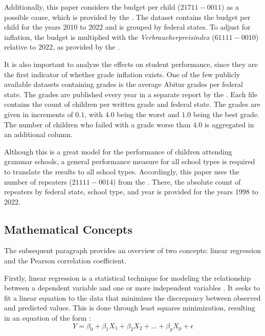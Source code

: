 Additionally, this paper considers the budget per child (\href{https://www-genesis.destatis.de/genesis//online?operation=table&code=21711-0011&bypass=true&levelindex=0&levelid=1706352648560#abreadcrumb}{$21711-0011$}) as a possible cause, which is provided  by the \citeauthor{statistische_bundesamt_statistisches_2024}. The dataset contains the budget per child for the years 2010 to 2022 and is grouped by federal states. To adjust for inflation, the budget is multiplied with the \textit{Verbraucherpreisindex} (\href{https://www-genesis.destatis.de/genesis//online?operation=table&code=61111-0010&bypass=true&levelindex=0&levelid=1706352769529#abreadcrumb}{$61111-0010$}) relative to 2022, as provided by the \citeauthor{statistische_bundesamt_statistisches_2024}. 


It is also important to analyze the  effects on student performance, since they are the first indicator of whether grade inflation exists. One of the few publicly available datasets containing grades is the average Abitur grades per federal state. The grades are published every year in a separate report by the \citeauthor{kultusminister_konferenz_abiturnoten_nodate}. Each file contains the count of children per written grade and federal state. The grades are given in increments of $0.1$, with $4.0$  being the worst and $1.0$ being the best grade. The number of children who failed with a grade worse than $4.0$ is aggregated in an additional column. 

Although this is a great model for the performance of children attending grammar schools, a general performance measure for all school types is required to translate the results to all school types. Accordingly, this paper uses the number of repeaters (\href{https://www-genesis.destatis.de/genesis//online?operation=table&code=21111-0014&bypass=true&levelindex=0&levelid=1706352887288#abreadcrumb}{$21111-0014$}) from the \citeauthor{statistische_bundesamt_statistisches_2024}. There, the absolute count of repeaters by federal state, school type, and year is provided for the years 1998 to 2022.

\subsection{Mathematical Concepts}
The subsequent paragraph provides an overview of two concepts: linear regression and the Pearson correlation coefficient.

Firstly, linear regression is a statistical technique for modeling the relationship between a dependent variable and one or more independent variables \cite{james_introduction_2021}. It seeks to fit a linear equation to the data that minimizes the discrepancy between observed and predicted values. This is done through least squares minimization, resulting in an equation of the form \cite{james_introduction_2021}:
\begin{equation}
    Y = \beta_0 + \beta_1 X_1 + \beta_2 X_2 +  ...+ \beta_p X_p + \epsilon 
\end{equation}

